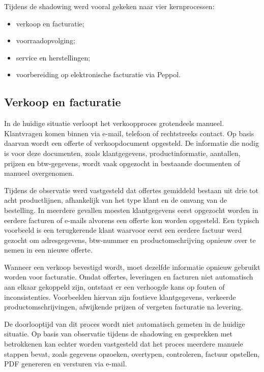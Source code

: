 Tijdens de shadowing werd vooral gekeken naar vier kernprocessen:

\begin{itemize}
    \item verkoop en facturatie;
    \item voorraadopvolging;
    \item service en herstellingen;
    \item voorbereiding op elektronische facturatie via Peppol.
\end{itemize}

\subsection{Verkoop en facturatie}

In de huidige situatie verloopt het verkoopproces grotendeels manueel. Klantvragen komen binnen via e-mail, telefoon of rechtstreeks contact. Op basis daarvan wordt een offerte of verkoopdocument opgesteld. De informatie die nodig is voor deze documenten, zoals klantgegevens, productinformatie, aantallen, prijzen en btw-gegevens, wordt vaak opgezocht in bestaande documenten of manueel overgenomen.

Tijdens de observatie werd vastgesteld dat offertes gemiddeld bestaan uit drie tot acht productlijnen, afhankelijk van het type klant en de omvang van de bestelling. In meerdere gevallen moesten klantgegevens eerst opgezocht worden in eerdere facturen of e-mails alvorens een offerte kon worden opgesteld. Een typisch voorbeeld is een terugkerende klant waarvoor eerst een eerdere factuur werd gezocht om adresgegevens, btw-nummer en productomschrijving opnieuw over te nemen in een nieuwe offerte.

Wanneer een verkoop bevestigd wordt, moet dezelfde informatie opnieuw gebruikt worden voor facturatie. Omdat offertes, leveringen en facturen niet automatisch aan elkaar gekoppeld zijn, ontstaat er een verhoogde kans op fouten of inconsistenties. Voorbeelden hiervan zijn foutieve klantgegevens, verkeerde productomschrijvingen, afwijkende prijzen of vergeten facturatie na levering.

De doorlooptijd van dit proces wordt niet automatisch gemeten in de huidige situatie. Op basis van observatie tijdens de shadowing en gesprekken met betrokkenen kan echter worden vastgesteld dat het proces meerdere manuele stappen bevat, zoals gegevens opzoeken, overtypen, controleren, factuur opstellen, PDF genereren en versturen via e-mail.

